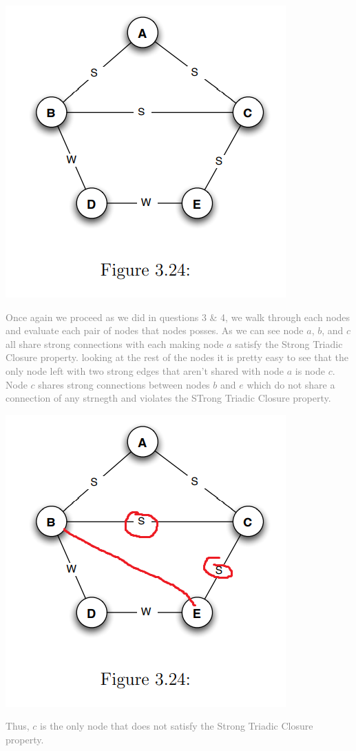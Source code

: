 \documentclass[11pt]{article}
\begin{document}
\begin{enumerate}
\begin{center}
	\includegraphics[scale=0.6]{Figure_3_24}
\end{center}
\textcolor{gray}{
Once again we proceed as we did in questions 3 \& 4, we walk through each nodes and evaluate each pair of nodes that nodes posses. As we can see node $a$, $b$, and $c$ all share strong connections with each making node $a$ satisfy the Strong Triadic Closure property.  looking at the rest of the nodes it is pretty easy to see that the only node left with two strong edges that aren't shared with node $a$ is node $c$.  Node $c$ shares strong connections between nodes $b$ and $e$ which do not share a connection of any strnegth and violates the STrong Triadic Closure property. \\
\begin{center}
	\includegraphics[scale=0.6]{Figure_3_25_Answer}
\end{center}
Thus, $c$ is the only node that does not satisfy the Strong Triadic Closure property.\\
}
\end{enumerate}
\end{document}
